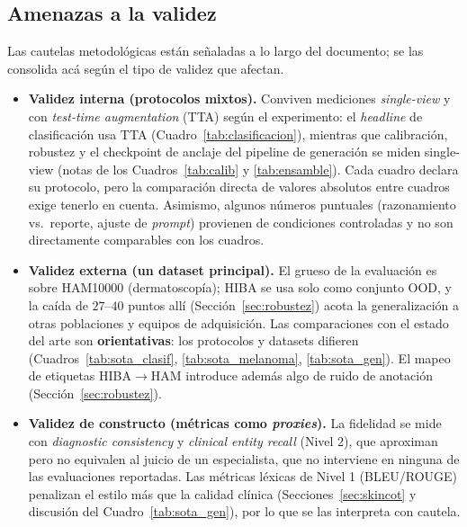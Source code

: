\documentclass[11pt, a4paper]{article}
\begin{document}
\subsection{Amenazas a la validez}
\label{sec:amenazas}
Las cautelas metodológicas están señaladas a lo largo del documento; se las consolida acá según el tipo de
validez que afectan.
\begin{itemize}[leftmargin=1.6em]
  \item \textbf{Validez interna (protocolos mixtos).} Conviven mediciones \emph{single-view} y con
  \emph{test-time augmentation} (TTA) según el experimento: el \emph{headline} de clasificación usa TTA
  (Cuadro~\ref{tab:clasificacion}), mientras que calibración, robustez y el checkpoint de anclaje del
  pipeline de generación se miden single-view (notas de los Cuadros~\ref{tab:calib} y \ref{tab:ensamble}).
  Cada cuadro declara su protocolo, pero la comparación directa de valores absolutos entre cuadros exige
  tenerlo en cuenta. Asimismo, algunos números puntuales (razonamiento vs.\ reporte, ajuste de
  \emph{prompt}) provienen de condiciones controladas y no son directamente comparables con los cuadros.
  \item \textbf{Validez externa (un dataset principal).} El grueso de la evaluación es sobre HAM10000
  (dermatoscopía); HIBA se usa solo como conjunto OOD, y la caída de $27$--$40$ puntos allí
  (Sección~\ref{sec:robustez}) acota la generalización a otras poblaciones y equipos de adquisición. Las
  comparaciones con el estado del arte son \textbf{orientativas}: los protocolos y datasets difieren
  (Cuadros~\ref{tab:sota_clasif}, \ref{tab:sota_melanoma}, \ref{tab:sota_gen}). El mapeo de etiquetas
  HIBA$\to$HAM introduce además algo de ruido de anotación (Sección~\ref{sec:robustez}).
  \item \textbf{Validez de constructo (métricas como \emph{proxies}).} La fidelidad se mide con
  \emph{diagnostic consistency} y \emph{clinical entity recall} (Nivel 2), que aproximan pero no equivalen
  al juicio de un especialista, que no interviene en ninguna de las evaluaciones reportadas. Las métricas
  léxicas de Nivel 1 (BLEU/ROUGE) penalizan el estilo más que la calidad clínica
  (Secciones~\ref{sec:skincot} y discusión del Cuadro~\ref{tab:sota_gen}), por lo que se las interpreta con
  cautela.
\end{itemize}
\end{document}
